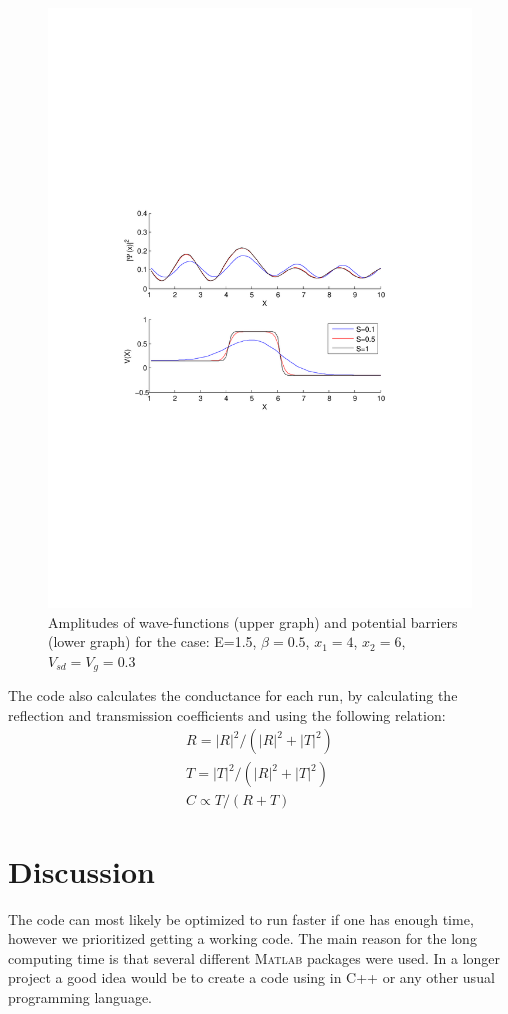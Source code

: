 \documentclass[a4paper]{article}
\begin{document}
\begin{figure}[h!]
\centering
\includegraphics[width=4.5in, trim = 0mm 100mm 0mm 100mm, clip]{test3}
\caption{Amplitudes of wave-functions (upper graph) and potential barriers (lower graph) for the case: E=1.5, $\beta=0.5$, $x_1=4$, $x_2=6$, $V_{sd}=V_g=0.3$}
\label{fig:test3}
\end{figure}

The code also calculates the conductance for each run, by calculating the reflection and transmission coefficients and using the following relation:
\begin{eqnarray*}
R=|R|^2/(|R|^2+|T|^2)\\
T=|T|^2/(|R|^2+|T|^2)\\
C \propto T/(R+T)
\end{eqnarray*}

\section{Discussion}


The code can most likely be optimized to run faster if one has enough time, however we prioritized getting a working code. The main reason for the long computing time is that several different \textsc{Matlab} packages were used. In a longer project a good idea would be to create a code using in C++ or any other usual programming language.
\end{document}
